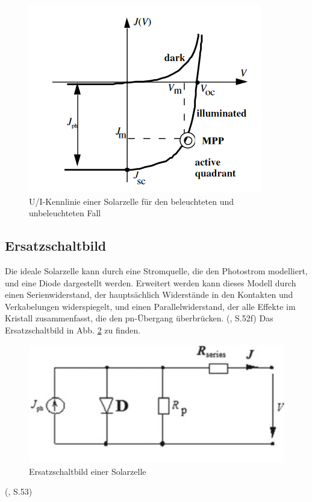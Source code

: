 \begin{figure}[h]
    \centering
    \includegraphics[scale=0.75]{Bilder/Kennlinien.png}
    \caption{U/I-Kennlinie einer Solarzelle für den beleuchteten und unbeleuchteten Fall \protect \footnotemark}
    \label{bild:kennlinien}
\end{figure}



\subsection{Ersatzschaltbild}
Die ideale Solarzelle kann durch eine Stromquelle, die den Photostrom modelliert, und eine Diode dargestellt werden. 
Erweitert werden kann dieses Modell durch einen Serienwiderstand, der hauptsächlich Widerstände in den Kontakten und Verkabelungen
widerspiegelt, und einen Parallelwiderstand, der alle Effekte im Kristall zusammenfasst, die den pn-Übergang überbrücken.
(\cite{Shah2020}, S.52f)
Das Ersatzschaltbild in Abb. \ref{bild:ersatzschaltbild} zu finden.

\begin{figure}[h]
    \centering
    \includegraphics[scale=0.5]{Bilder/Ersatzschaltbild.png}
    \caption{Ersatzschaltbild einer Solarzelle}
    \label{bild:ersatzschaltbild}
\end{figure}
(\cite{Shah2020}, S.53)


